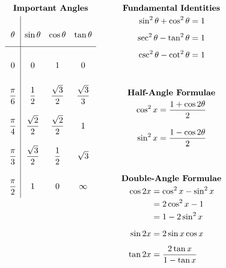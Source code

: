 \begingroup
\[
\arraycolsep=1.5em\def\arraystretch{3}
\begin{array}{cc}
\arraycolsep=0.5em
\begin{gathered}[t]\textbf{Important Angles}\\
\begin{array}{c|ccc}
        \theta  & \sin\theta          & \cos\theta          & \tan\theta         \\
\hline
            0   &             {0}     &             {1}     &             {0}     \\
\dfrac{\pi}{6}  & \dfrac      {1} {2} & \dfrac{\sqrt{3}}{2} & \dfrac{\sqrt{3}}{3} \\
\dfrac{\pi}{4}  & \dfrac{\sqrt{2}}{2} & \dfrac{\sqrt{2}}{2} &             {1}     \\
\dfrac{\pi}{3}  & \dfrac{\sqrt{3}}{2} & \dfrac      {1} {2} &        \sqrt{3}     \\
\dfrac{\pi}{2}  &             {1}     &             {0}     &       \infty
\end{array}\end{gathered}
&
\begin{gathered}[t]
\begin{gathered}[t]\textbf{Fundamental Identities}\\
\begin{aligned}
\sin^2\theta+\cos^2\theta&=1\\[.5em]
\sec^2\theta-\tan^2\theta&=1\\[.5em]
\csc^2\theta-\cot^2\theta&=1
\end{aligned}\end{gathered}
\\[3em]
\begin{gathered}[t]\textbf{Half-Angle Formulae}\\
\begin{aligned}
\cos^2x=\frac{1+\cos{2\theta}}{2}\\[1em]
\sin^2x=\frac{1-\cos{2\theta}}{2}
\end{aligned}\end{gathered}
\\[3em]
\begin{gathered}[t]\textbf{Double-Angle Formulae}\\
\begin{aligned}
  \cos{2x}&=\cos^2x-\sin^2x\\&=2\cos^2x-1\\&=1-2\sin^2x\\[0.5em]
  \sin{2x}&=2\sin x \cos x\\[0.5em]
  \tan{2x}&=\frac{2\tan x}{1-\tan x}
\end{aligned}\end{gathered}
\end{gathered}
\end{array}
\]







\endgroup
